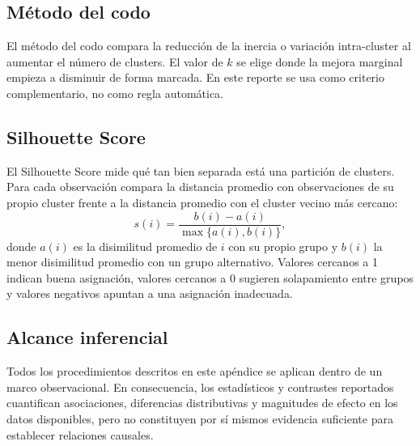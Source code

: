 \documentclass[10pt,letterpaper]{article} %
\numberwithin{figure}{subsection}
\begin{document}
\subsection{Método del codo}
\label{apx:elbow}
El método del codo compara la reducción de la inercia o variación intra-cluster al aumentar el número de clusters. El valor de $k$ se elige donde la mejora marginal empieza a disminuir de forma marcada. En este reporte se usa como criterio complementario, no como regla automática.

\subsection{Silhouette Score}
\label{apx:silhouette}
El Silhouette Score mide qué tan bien separada está una partición de clusters. Para cada observación compara la distancia promedio con observaciones de su propio cluster frente a la distancia promedio con el cluster vecino más cercano:
\[
s(i)=\frac{b(i)-a(i)}{\max\{a(i),b(i)\}},
\]
donde $a(i)$ es la disimilitud promedio de $i$ con su propio grupo y $b(i)$ la menor disimilitud promedio con un grupo alternativo. Valores cercanos a 1 indican buena asignación, valores cercanos a 0 sugieren solapamiento entre grupos y valores negativos apuntan a una asignación inadecuada.

\subsection{Alcance inferencial}
\label{apx:inference}
Todos los procedimientos descritos en este apéndice se aplican dentro de un marco observacional. En consecuencia, los estadísticos y contrastes reportados cuantifican asociaciones, diferencias distributivas y magnitudes de efecto en los datos disponibles, pero no constituyen por sí mismos evidencia suficiente para establecer relaciones causales.
\end{document}
